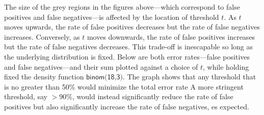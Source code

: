 \documentclass{article}
\begin{document}






The size of the grey regions in the figures above---which correspond to false positives and false negatives---is affected by the location of threshold $t$. As $t$ moves upwards, the rate of false positives decreases but the rate of false negatives increases. Conversely, as $t$ moves downwards, the rate of false positives increases but the rate of false negatives decreases. This trade-off is inescapable so long as the underlying distribution is fixed. Below are both error rates---false positives and false negatives---and their sum plotted against a choice of $t$, while holding fixed the   density function $\textsf{binom(18,3)}$.
The graph shows that any threshold that is no greater than 50\% would minimize the total error rate %
A more stringent threshold, say $>90\%$, would instead  significantly reduce the rate of false positives but also significantly increase the rate of false negatives, es expected. 
\end{document}
